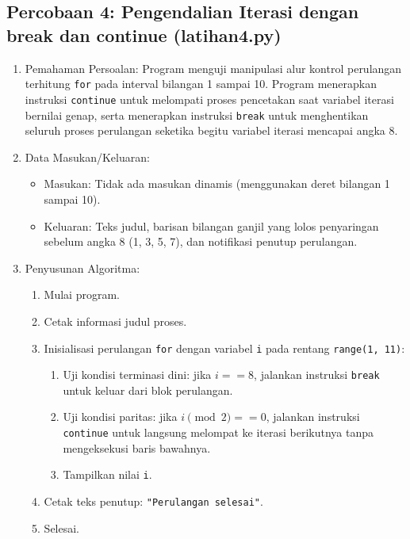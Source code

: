 \documentclass[12pt,a4paper]{article}
\begin{document}
\subsection{Percobaan 4: Pengendalian Iterasi dengan break dan continue (latihan4.py)}
\begin{enumerate}
    \item Pemahaman Persoalan: Program menguji manipulasi alur kontrol perulangan terhitung \texttt{for} pada interval bilangan 1 sampai 10. Program menerapkan instruksi \texttt{continue} untuk melompati proses pencetakan saat variabel iterasi bernilai genap, serta menerapkan instruksi \texttt{break} untuk menghentikan seluruh proses perulangan seketika begitu variabel iterasi mencapai angka 8.
    \item Data Masukan/Keluaran:
    \begin{itemize}
        \item Masukan: Tidak ada masukan dinamis (menggunakan deret bilangan 1 sampai 10).
        \item Keluaran: Teks judul, barisan bilangan ganjil yang lolos penyaringan sebelum angka 8 (1, 3, 5, 7), dan notifikasi penutup perulangan.
    \end{itemize}
    \item Penyusunan Algoritma:
    \begin{enumerate}[label=\alph*.]
        \item Mulai program.
        \item Cetak informasi judul proses.
        \item Inisialisasi perulangan \texttt{for} dengan variabel \texttt{i} pada rentang \texttt{range(1, 11)}:
        \begin{enumerate}[label=\roman*.]
            \item Uji kondisi terminasi dini: jika $i == 8$, jalankan instruksi \texttt{break} untuk keluar dari blok perulangan.
            \item Uji kondisi paritas: jika $i \pmod 2 == 0$, jalankan instruksi \texttt{continue} untuk langsung melompat ke iterasi berikutnya tanpa mengeksekusi baris bawahnya.
            \item Tampilkan nilai \texttt{i}.
        \end{enumerate}
        \item Cetak teks penutup: \texttt{"Perulangan selesai"}.
        \item Selesai.
    \end{enumerate}
\end{enumerate}
\end{document}
